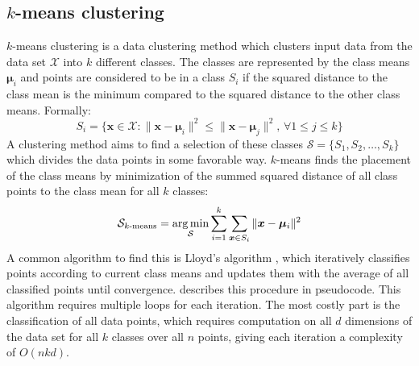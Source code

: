 
\subsection{$k$-means clustering}

$k$-means clustering is a data clustering method
which clusters input data from the data set $\mathcal{X}$ into $k$ different classes.
The classes are represented by the class means $\bm{\mu}_i$ and points are considered to be in a class $S_i$
if the squared distance to the class mean is the minimum
compared to the squared distance to the other class means.
Formally:
\[
      S_i = \{ \bm{x} \in \mathcal{X}
   :  \|\bm{x} - \bm{\mu}_i\|^2 \leq \|\bm{x} - \bm{\mu}_j\|^2
  ,\, \forall 1 \leq j \leq k \}
\]
A clustering method aims to find a selection of these classes
$\mathcal{S} = \{S_1, S_2, \ldots, S_k\}$
which divides the data points in some favorable way.
$k$-means finds the placement of the class means
by minimization of the summed squared distance of all class points to the class mean for all $k$ classes:
\[
  \mathcal{S}_{k\text{-means}}
  = \operatorname*{arg\,min}_\mathcal{S} \sum_{i=1}^k \sum_{\bm{x} \in S_i} \|\bm{x} - \bm{\mu}_i\|^2
\]
A common algorithm to find this is Lloyd's algorithm \cite{lloyd},
which iteratively classifies points according to current class means
and updates them with the average of all classified points until convergence.
 describes this procedure in pseudocode.
This algorithm requires multiple loops for each iteration.
The most costly part is the classification of all data points,
which requires computation on all $d$ dimensions of the data set
for all $k$ classes over all $n$ points,
giving each iteration a complexity of $O(nkd)$.

